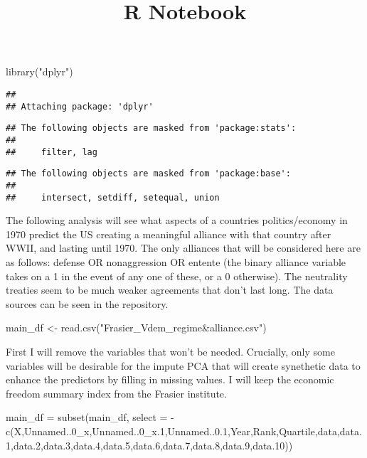 \documentclass[
]{article}
\title{R Notebook}
\author{}
\date{\vspace{-2.5em}}
\newenvironment{Shaded}{\begin{snugshade}}{\end{snugshade}}
\newcommand{\AttributeTok}[1]{\textcolor[rgb]{0.77,0.63,0.00}{#1}}
\newcommand{\FloatTok}[1]{\textcolor[rgb]{0.00,0.00,0.81}{#1}}
\newcommand{\FunctionTok}[1]{\textcolor[rgb]{0.00,0.00,0.00}{#1}}
\newcommand{\NormalTok}[1]{#1}
\newcommand{\OtherTok}[1]{\textcolor[rgb]{0.56,0.35,0.01}{#1}}
\newcommand{\SpecialCharTok}[1]{\textcolor[rgb]{0.00,0.00,0.00}{#1}}
\newcommand{\StringTok}[1]{\textcolor[rgb]{0.31,0.60,0.02}{#1}}
\begin{document}
\maketitle

\begin{Shaded}
\begin{Highlighting}[]
\FunctionTok{library}\NormalTok{(}\StringTok{"dplyr"}\NormalTok{)}
\end{Highlighting}
\end{Shaded}

\begin{verbatim}
## 
## Attaching package: 'dplyr'
\end{verbatim}

\begin{verbatim}
## The following objects are masked from 'package:stats':
## 
##     filter, lag
\end{verbatim}

\begin{verbatim}
## The following objects are masked from 'package:base':
## 
##     intersect, setdiff, setequal, union
\end{verbatim}

The following analysis will see what aspects of a countries
politics/economy in 1970 predict the US creating a meaningful alliance
with that country after WWII, and lasting until 1970. The only alliances
that will be considered here are as follows: defense OR nonaggression OR
entente (the binary alliance variable takes on a 1 in the event of any
one of these, or a 0 otherwise). The neutrality treaties seem to be much
weaker agreements that don't last long. The data sources can be seen in
the repository.

\begin{Shaded}
\begin{Highlighting}[]
\NormalTok{main\_df }\OtherTok{\textless{}{-}} \FunctionTok{read.csv}\NormalTok{(}\StringTok{"Frasier\_Vdem\_regime\&alliance.csv"}\NormalTok{)}
\end{Highlighting}
\end{Shaded}

First I will remove the variables that won't be needed. Crucially, only
some variables will be desirable for the impute PCA that will create
synethetic data to enhance the predictors by filling in missing values.
I will keep the economic freedom summary index from the Frasier
institute.

\begin{Shaded}
\begin{Highlighting}[]
\NormalTok{main\_df }\OtherTok{=} \FunctionTok{subset}\NormalTok{(main\_df, }\AttributeTok{select =} \SpecialCharTok{{-}}\FunctionTok{c}\NormalTok{(X,Unnamed..0\_x,Unnamed..0\_x}\FloatTok{.1}\NormalTok{,Unnamed..}\FloatTok{0.1}\NormalTok{,Year,Rank,Quartile,data,data}\FloatTok{.1}\NormalTok{,data}\FloatTok{.2}\NormalTok{,data}\FloatTok{.3}\NormalTok{,data}\FloatTok{.4}\NormalTok{,data}\FloatTok{.5}\NormalTok{,data}\FloatTok{.6}\NormalTok{,data}\FloatTok{.7}\NormalTok{,data}\FloatTok{.8}\NormalTok{,data}\FloatTok{.9}\NormalTok{,data}\FloatTok{.10}\NormalTok{))}
\end{Highlighting}
\end{Shaded}
\end{document}
